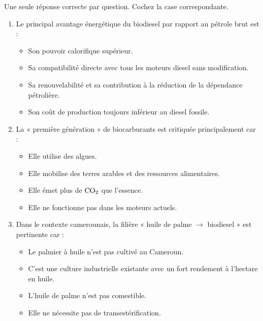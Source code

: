 \documentclass[11pt]{article}
\begin{document}
\begin{exercice}
Une seule réponse correcte par question. Cochez la case correspondante.
\begin{enumerate}
    \item Le principal avantage énergétique du biodiesel par rapport au pétrole brut est :
\begin{itemize}
        \item[$\square$] Son pouvoir calorifique supérieur.
        \item[$\square$] Sa compatibilité directe avec tous les moteurs diesel sans modification.
        \item[$\square$] Sa renouvelabilité et sa contribution à la réduction de la dépendance pétrolière.
        \item[$\square$] Son coût de production toujours inférieur au diesel fossile.
    \end{itemize}
    \item La « première génération » de biocarburants est critiquée principalement car :
\begin{itemize}
        \item[$\square$] Elle utilise des algues.
        \item[$\square$] Elle mobilise des terres arables et des ressources alimentaires.
        \item[$\square$] Elle émet plus de $\ce{CO2}$ que l'essence.
        \item[$\square$] Elle ne fonctionne pas dans les moteurs actuels.
    \end{itemize}
    \item Dans le contexte camerounais, la filière « huile de palme $\rightarrow$ biodiesel » est pertinente car :
\begin{itemize}
        \item[$\square$] Le palmier à huile n'est pas cultivé au Cameroun.
        \item[$\square$] C'est une culture industrielle existante avec un fort rendement à l'hectare en huile.
        \item[$\square$] L'huile de palme n'est pas comestible.
        \item[$\square$] Elle ne nécessite pas de transestérification.
    \end{itemize}
\end{enumerate}
\end{exercice}
\end{document}
